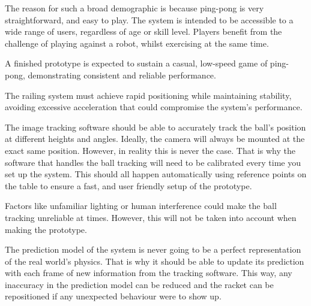 The reason for such a broad demographic is because ping-pong is very straightforward, and easy to play. The system is intended to be accessible to a wide range of users, regardless of age or skill level. Players benefit from the challenge of playing against a robot, whilst exercising at the same time.

A finished prototype is expected to sustain a casual, low-speed game of ping-pong, demonstrating consistent and reliable performance.

The railing system must achieve rapid positioning while maintaining stability, avoiding excessive acceleration that could compromise the system's performance.

The image tracking software should be able to accurately track the ball's position at different heights and angles. Ideally, the camera will always be mounted at the exact same position. However, in reality this is never the case. That is why the software that handles the ball tracking will need to be calibrated every time you set up the system. This should all happen automatically using reference points on the table to ensure a fast, and user friendly setup of the prototype.

Factors like unfamiliar lighting or human interference could make the ball tracking unreliable at times. However, this will not be taken into account when making the prototype.

The prediction model of the system is never going to be a perfect representation of the real world's physics. That is why it should be able to update its prediction with each frame of new information from the tracking software. This way, any inaccuracy in the prediction model can be reduced and the racket can be repositioned if any unexpected behaviour were to show up.